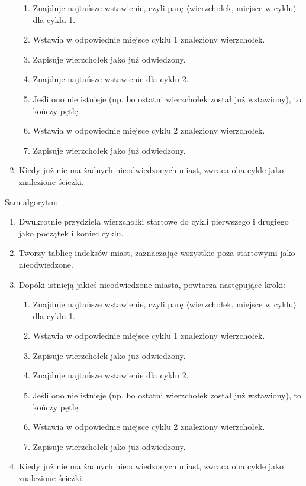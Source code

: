 \documentclass[11pt]{article}
\begin{document}
\begin{enumerate}
\begin{enumerate}
        \item Znajduje najtańsze wstawienie, czyli parę \(\langle\)wierzchołek, miejsce w cyklu\(\rangle\) dla cyklu 1.
        \item Wstawia w odpowiednie miejsce cyklu 1 znaleziony wierzchołek.
        \item Zapisuje wierzchołek jako już odwiedzony.
        \item Znajduje najtańsze wstawienie dla cyklu 2.
        \item Jeśli ono nie istnieje (np. bo ostatni wierzchołek został już wstawiony), to kończy pętlę.
        \item Wstawia w odpowiednie miejsce cyklu 2 znaleziony wierzchołek.
        \item Zapisuje wierzchołek jako już odwiedzony.
    \end{enumerate}
    \item Kiedy już nie ma żadnych nieodwiedzonych miast, zwraca oba cykle jako znalezione ścieżki.
\end{enumerate}

Sam algorytm:
\begin{enumerate}
    \item Dwukrotnie przydziela wierzchołki startowe do cykli pierwszego i drugiego jako początek i koniec cyklu.
    \item Tworzy tablicę indeksów miast, zaznaczając wszystkie poza startowymi jako nieodwiedzone.
    \item Dopóki istnieją jakieś nieodwiedzone miasta, powtarza następujące kroki:
    \begin{enumerate}
        \item Znajduje najtańsze wstawienie, czyli parę \(\langle\)wierzchołek, miejsce w cyklu\(\rangle\) dla cyklu 1.
        \item Wstawia w odpowiednie miejsce cyklu 1 znaleziony wierzchołek.
        \item Zapisuje wierzchołek jako już odwiedzony.
        \item Znajduje najtańsze wstawienie dla cyklu 2.
        \item Jeśli ono nie istnieje (np. bo ostatni wierzchołek został już wstawiony), to kończy pętlę.
        \item Wstawia w odpowiednie miejsce cyklu 2 znaleziony wierzchołek.
        \item Zapisuje wierzchołek jako już odwiedzony.
    \end{enumerate}
    \item Kiedy już nie ma żadnych nieodwiedzonych miast, zwraca oba cykle jako znalezione ścieżki.
\end{enumerate}
\end{document}
